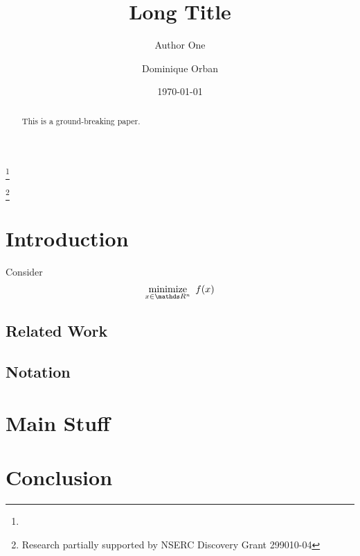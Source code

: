 \documentclass{amsart}
\begin{document}
\linenumbers

\title[Short Title]{%
  Long Title
}

\author[A. One]{Author One}
\address{%
  Some Lab, Some Univeristy, Some Place
}
\thanks{}

\author[D. Orban]{Dominique Orban}
\address{%
  GERAD and
  Mathematics and Industrial Engineering Department \\
  \'Ecole Polytechnique, Montr\'eal, Canada
}
\thanks{Research partially supported by NSERC Discovery Grant 299010-04}



\date{\today}

\begin{abstract}
  This is a ground-breaking paper.
\end{abstract}

\maketitle

\pagestyle{myheadings}

\tableofcontents
\listoftodos\relax   %

\section{Introduction}

Consider
\begin{equation}
  \label{eq:nlp}
  \minimize{x \in  \R^n} \ f(x)
\end{equation}

\subsection*{Related Work}

\subsection*{Notation}


\section{Main Stuff}

\section{Conclusion}



\end{document}

